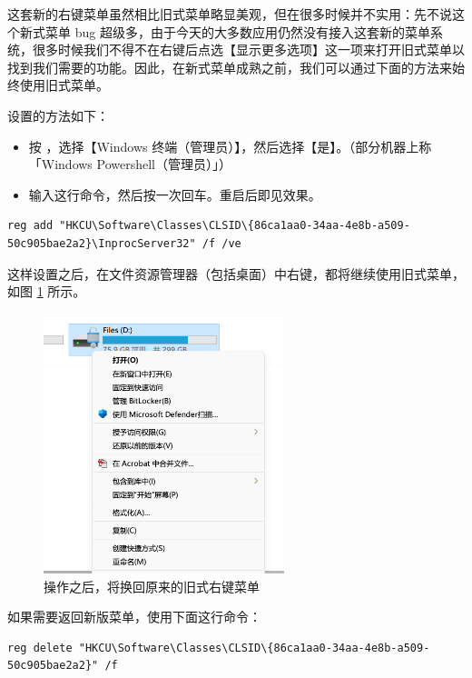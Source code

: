 这套新的右键菜单虽然相比旧式菜单略显美观，但在很多时候并不实用：先不说这个新式菜单 bug 超级多，由于今天的大多数应用仍然没有接入这套新的菜单系统，很多时候我们不得不在右键后点选【显示更多选项】这一项来打开旧式菜单以找到我们需要的功能。因此，在新式菜单成熟之前，我们可以通过下面的方法来始终使用旧式菜单。

设置的方法如下：

\begin{itemize}
  \item 按 ，选择【Windows 终端（管理员）】，然后选择【是】。（部分机器上称「Windows Powershell（管理员）」）
  \item 输入这行命令，然后按一次回车。重启后即见效果。
\end{itemize}

\begin{Verbatim}[fontsize=\footnotesize]
  reg add "HKCU\Software\Classes\CLSID\{86ca1aa0-34aa-4e8b-a509-50c905bae2a2}\InprocServer32" /f /ve
\end{Verbatim}

这样设置之后，在文件资源管理器（包括桌面）中右键，都将继续使用旧式菜单，如图 \ref{Old_menu} 所示。

\begin{figure}[htb!]
  \centering
  \includegraphics[width=7cm]{assets/Old_menu.png}
  \caption{操作之后，将换回原来的旧式右键菜单}
  \label{Old_menu}
\end{figure}

如果需要返回新版菜单，使用下面这行命令：

\begin{Verbatim}[fontsize=\small]
  reg delete "HKCU\Software\Classes\CLSID\{86ca1aa0-34aa-4e8b-a509-50c905bae2a2}" /f
\end{Verbatim}
